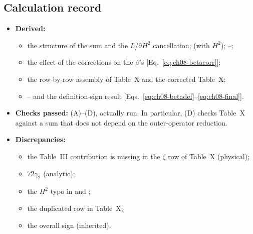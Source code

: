 \subsection{Calculation record}
\begin{itemize}[leftmargin=*,itemsep=2pt]
\item \textbf{Derived:}
\begin{itemize}[itemsep=0pt]
\item the structure of the sum and the $L$/$9H^2$ cancellation;  (with $H^2$); --;
\item the effect of the corrections on the $\beta$'s [Eq.~\eqref{eq:ch08-betacorr}];
\item the row-by-row assembly of Table~X and the corrected Table~X;
\item {}-- and the definition-sign result [Eqs.~\eqref{eq:ch08-betadef}--\eqref{eq:ch08-final}].
\end{itemize}
\item \textbf{Checks passed:} (A)--(D), actually run. In particular, (D) checks Table~X against a sum that does not depend on the outer-operator reduction.
\item \textbf{Discrepancies:}
\begin{itemize}[itemsep=0pt]
\item the Table~III contribution is missing in the $\zeta$ row of Table~X (physical);
\item $72\gamma_2$ (analytic);
\item the $H^2$ typo in  and ;
\item the duplicated row in Table~X;
\item the overall sign (inherited).
\end{itemize}
\end{itemize}
